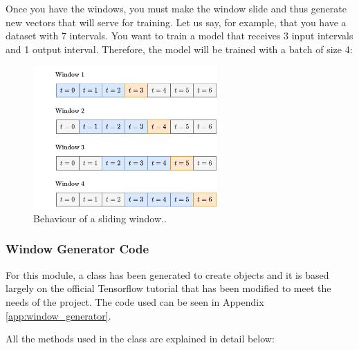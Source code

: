 Once you have the windows, you must make the window slide and thus generate new vectors that will serve for training. Let us say, for example, that you have a dataset with 7 intervals. You want to train a model that receives 3 input intervals and 1 output interval. Therefore, the model will be trained with a batch of size 4:


\begin{figure}[H]
    \centering
    \includegraphics[width=7cm]{images/solution/modules/windows/sliding-windows.png}
    \caption{Behaviour of a sliding window..}
\end{figure}


\subsubsection{Window Generator Code}\label{window-generator-code}


For this module, a class has been generated to create objects and it is based largely on the official Tensorflow tutorial \cite{tensorflow2015-whitepaper} that has been modified to meet the needs of the project. The code used can be seen in Appendix \ref{app:window_generator}.
\newline

All the methods used in the class are explained in detail below:


